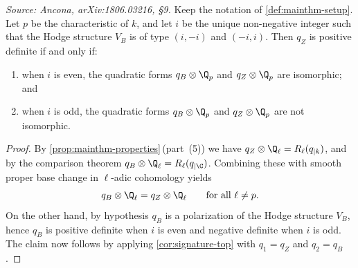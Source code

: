 \begin{proposition}
  \label{prop:padic-reduction}
  \textit{Source: Ancona, arXiv:1806.03216, §9.}
  Keep the notation of \cref{def:mainthm-setup}. Let \(p\) be the characteristic
  of \(k\), and let \(i\) be the unique non-negative integer such that the Hodge
  structure \(V_B\) is of type \((i,-i)\) and \((-i,i)\). Then \(q_Z\) is
  positive definite if and only if:
  \begin{enumerate}
    \item when \(i\) is even, the quadratic forms \(q_B \otimes \Q_p\) and
      \(q_Z \otimes \Q_p\) are isomorphic; and
    \item when \(i\) is odd, the quadratic forms \(q_B \otimes \Q_p\) and
      \(q_Z \otimes \Q_p\) are not isomorphic.
  \end{enumerate}
\end{proposition}

\begin{proof}
  By \cref{prop:mainthm-properties}\,(part~(5)) we
  have \(q_Z \otimes \Q_\ell = R_\ell(q_{\vert{k}})\), and by the comparison
  theorem \(q_B \otimes \Q_\ell = R_\ell(q_{\vert\C})\). Combining these with
  smooth proper base change in \(\ell\)-adic cohomology yields
  \[q_B \otimes \Q_\ell = q_Z \otimes \Q_\ell \qquad
    \text{for all } \ell \neq p.\]
  On the other hand, by hypothesis \(q_B\) is a polarization of the Hodge
  structure \(V_B\), hence \(q_B\) is positive definite when \(i\) is even and
  negative definite when \(i\) is odd. The claim now follows by applying
  \cref{cor:signature-top} with \(q_1 = q_Z\) and \(q_2 = q_B\).
\end{proof}
